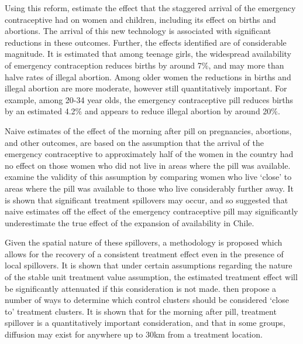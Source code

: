 Using this reform, \Person estimate the effect that the staggered arrival of the 
emergency contraceptive had on women and children, including its effect on births 
and abortions.  The arrival of this new technology is associated with significant 
reductions in these outcomes.  Further, the effects identified are of considerable
magnitude.  It is estimated that among teenage girls, the widespread availability 
of emergency contraception reduces births by around 7\%, and may more than halve 
rates of illegal abortion.  Among older women the reductions in births and illegal 
abortion are more moderate, however still quantitatively important.  For example, 
among 20-34 year olds, the emergency contraceptive pill reduces births by an 
estimated 4.2\% and appears to reduce illegal abortion by around 20\%.

\nocite{Goldin2006, Bailey2011}
\nocite{KearnerLevine2009}
\nocite{Ananatetal2007,KaneStaiger1996,Levineetal1996}

Naive estimates of the effect of the morning after pill on pregnancies, 
abortions, and other outcomes, are based on the assumption that the arrival of
the emergency contraceptive to approximately half of the women in the country
had no effect on those women who did not live in areas where the pill was
available.  \Person examine the validity of this assumption by comparing women 
who live `close' to areas where the pill was available to those who live
considerably further away.  It is shown that significant treatment spillovers
may occur, and so suggested that naive estimates off the effect of the emergency 
contraceptive pill may significantly underestimate the true effect of the 
expansion of availability in Chile.

Given the spatial nature of these spillovers, a methodology is proposed which
allows for the recovery of a consistent treatment effect even in the presence
of local spillovers.  It is shown that under certain assumptions regarding the
nature of the stable unit treatment value assumption, the estimated treatment 
effect will be significantly attenuated if this consideration is not made.
\Person then propose a number of ways to determine which control clusters should
be considered `close to' treatment clusters.  It is shown that for the morning
after pill, treatment spillover is a quantitatively important consideration,
and that in some groups, diffusion may exist for anywhere up to 30km from a
treatment location.

